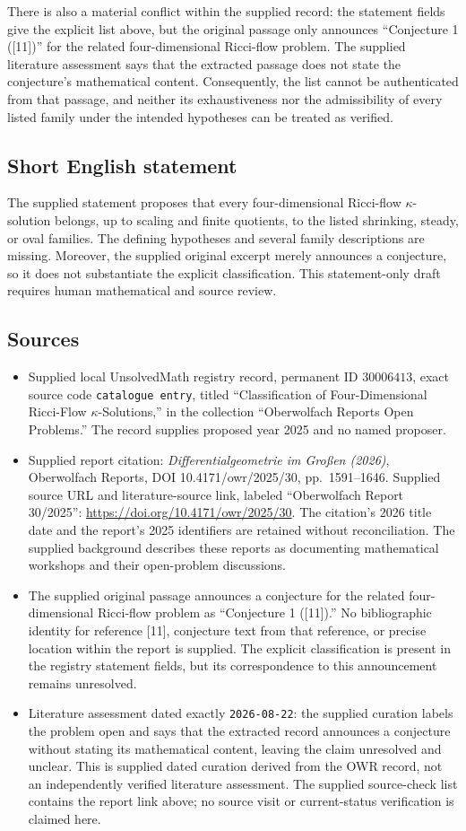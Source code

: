 \documentclass[11pt]{article}
\begin{document}
There is also a material conflict within the supplied record: the statement fields give the explicit list above, but the original passage only announces ``Conjecture 1 ([11])'' for the related four-dimensional Ricci-flow problem. The supplied literature assessment says that the extracted passage does not state the conjecture's mathematical content. Consequently, the list cannot be authenticated from that passage, and neither its exhaustiveness nor the admissibility of every listed family under the intended hypotheses can be treated as verified.
\subsection{Short English statement}
The supplied statement proposes that every four-dimensional Ricci-flow \(\kappa\)-solution belongs, up to scaling and finite quotients, to the listed shrinking, steady, or oval families. The defining hypotheses and several family descriptions are missing. Moreover, the supplied original excerpt merely announces a conjecture, so it does not substantiate the explicit classification. This statement-only draft requires human mathematical and source review.
\subsection{Sources}
\begin{itemize}
\item Supplied local UnsolvedMath registry record, permanent ID \(30006413\), exact source code \texttt{catalogue entry}, titled ``Classification of Four-Dimensional Ricci-Flow \(\kappa\)-Solutions,'' in the collection ``Oberwolfach Reports Open Problems.'' The record supplies proposed year 2025 and no named proposer.
\item Supplied report citation: \emph{Differentialgeometrie im Großen (2026)}, Oberwolfach Reports, DOI 10.4171/owr/2025/30, pp.~1591--1646. Supplied source URL and literature-source link, labeled ``Oberwolfach Report 30/2025'': \url{https://doi.org/10.4171/owr/2025/30}. The citation's 2026 title date and the report's 2025 identifiers are retained without reconciliation. The supplied background describes these reports as documenting mathematical workshops and their open-problem discussions.
\item The supplied original passage announces a conjecture for the related four-dimensional Ricci-flow problem as ``Conjecture 1 ([11]).'' No bibliographic identity for reference [11], conjecture text from that reference, or precise location within the report is supplied. The explicit classification is present in the registry statement fields, but its correspondence to this announcement remains unresolved.
\item Literature assessment dated exactly \texttt{2026-08-22}: the supplied curation labels the problem open and says that the extracted record announces a conjecture without stating its mathematical content, leaving the claim unresolved and unclear. This is supplied dated curation derived from the OWR record, not an independently verified literature assessment. The supplied source-check list contains the report link above; no source visit or current-status verification is claimed here.
\end{itemize}
\end{document}
